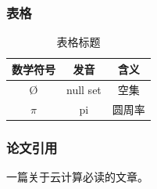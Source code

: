 \documentclass{config}
\begin{document}
\subsubsection{表格}

\begin{table}[h]
    \caption{表格标题}
    \centering
    \label{table}
    \begin{tabular}{c|c|c}
        \toprule
        数学符号  & 发音       & 含义  \\
        \midrule
        \O    & null set & 空集  \\
        $\pi$ & pi       & 圆周率 \\
        \bottomrule
    \end{tabular}
\end{table}

\subsubsection{论文引用}

一篇关于云计算必读的文章\cite{fox2009above}。

\newpage


\end{document}
